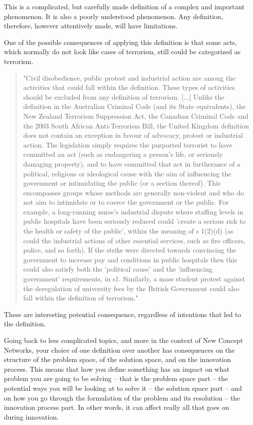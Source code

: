 \documentclass[graybox,envcountchap,sectrefs]{svmono}
\newcommand{\ncnf}{New Concept Network}
\begin{document}
This is a complicated, but carefully made definition of a complex and important phenomenon. It is also a poorly understood phenomenon. Any definition, therefore, however attentively made, will have limitations.

One of the possible consequences of applying this definition is that some acts, which normally do not look like cases of terrorism, still could be categorized as terrorism.

\begin{quote}
"Civil disobedience, public protest and industrial action are among the activities that could fall within the definition. These types of activities should be excluded from any definition of terrorism. [...] Unlike the definition in the Australian Criminal Code (and its State equivalents), the New Zealand Terrorism Suppression Act, the Canadian Criminal Code and the 2003 South African Anti-Terrorism Bill, the United Kingdom definition does not contain an exception in favour of advocacy, protest or industrial action. The legislation simply requires the purported terrorist to have committed an act (such as endangering a person's life, or seriously damaging property), and to have committed that act in furtherance of a political, religious or ideological cause with the aim of influencing the government or intimidating the public (or a section thereof). This encompasses groups whose methods are generally non-violent and who do not aim to intimidate or to coerce the government or the public. For example, a long-running nurse's industrial dispute where staffing levels in public hospitals have been seriously reduced could 'create a serious risk to the health or safety of the public', within the meaning of s 1(2)(d) (as could the industrial actions of other essential services, such as fire officers, police, and so forth). If the strike were directed towards convincing the government to increase pay and conditions in public hospitals then this could also satisfy both the 'political cause' and the 'influencing government' requirements, in s1. Similarly, a mass student protest against the deregulation of university fees by the British Government could also fall within the definition of terrorism." \cite{golder2004terrorism}
\end{quote}

These are interesting potential consequence, regardless of intentions that led to the definition.

Going back to less complicated topics, and more in the context of \ncnf{}s, your choice of one definition over another has consequences on the structure of the problem space, of the solution space, and on the innovation process. This means that how you define something has an impact on what problem you are going to be solving -- that is the problem space part -- the potential ways you will be looking at to solve it -- the solution space part -- and on how you go through the formulation of the problem and its resolution -- the innovation process part. In other words, it can affect really all that goes on during innovation.
\end{document}

